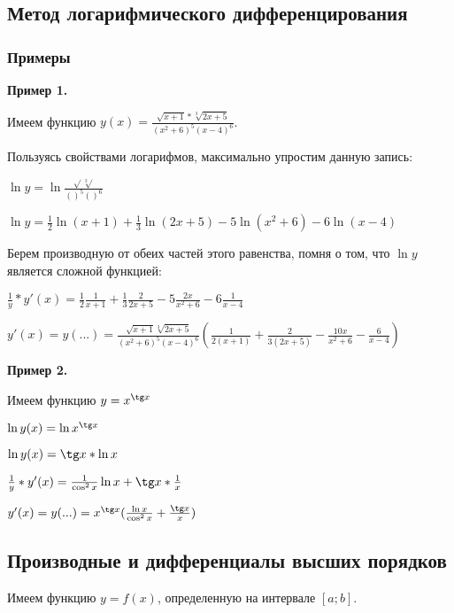 \documentclass{article}
\begin{document}
\begin{flushleft}
\subsection{Метод логарифмического дифференцирования}

\subsubsection{Примеры}

\textbf{Пример 1.}

Имеем функцию $y(x) = \frac{\sqrt{x + 1} * \sqrt[3]{2x + 5}}{(x^2 + 6)^5 (x - 4)^6}$.

Пользуясь свойствами логарифмов, максимально упростим данную запись:

\hfill

$\ln y = \ln \frac{\sqrt{} \sqrt[3]{}}{( )^5 ( )^6}$

$\ln y = \frac{1}{2} \ln (x + 1) + \frac{1}{3} \ln (2x + 5) - 5 \ln (x^2 + 6) - 6 \ln (x - 4)$

\hfill

Берем производную от обеих частей этого равенства, помня о том, что $\ln y$ является сложной функцией:

\hfill

$\frac{1}{y} * y'(x) = \frac{1}{2} \frac{1}{x + 1} + \frac{1}{3} \frac{2}{2x + 5} - 5 \frac{2x}{x^2 + 6} - 6 \frac{1}{x - 4}$

$y'(x) = y(...) = \frac{\sqrt{x + 1} \sqrt[3]{2x + 5}}{(x^2 + 6)^5 (x - 4)^6} (\frac{1}{2(x+1)} + \frac{2}{3(2x + 5)} - \frac{10x}{x^2 + 6} - \frac{6}{x - 4})$

\hfill

\textbf{Пример 2.}

Имеем функцию $y = x^{\tg x}$

\hfill

$\ln y(x) = \ln x^{\tg x}$

$\ln y(x) = \tg x * \ln x$

$\frac{1}{y} * y'(x) = \frac{1}{\cos^2 x} \ln x + \tg x * \frac{1}{x}$

$y'(x) = y(...) = x^{\tg x} (\frac{\ln x}{\cos^2 x} + \frac{\tg x}{x})$

\subsection{Производные и дифференциалы высших порядков}

Имеем функцию $y = f(x)$, определенную на интервале $[ a; b ]$.


\end{flushleft}
\end{document}

